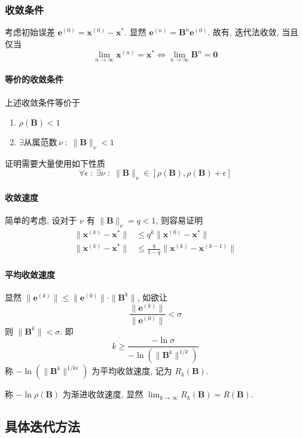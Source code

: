 \documentclass{ctexart}
\begin{document}
\subsubsection{收敛条件}
    考虑初始误差 $\mathbf{e}^{(0)} = \mathbf{x}^{(0)} - \mathbf{x}^*$.
    显然 $\mathbf{e}^{(n)} = \mathbf{B}^n \mathbf{e}^{(0)}$.
    故有, 迭代法收敛, 当且仅当 \[
        \lim_{n\to\infty} \mathbf{x}^{(n)} = \mathbf{x}^* \Leftrightarrow %
        \lim_{n\to\infty} \mathbf{B}^n = \mathbf{0}\]
\paragraph{等价的收敛条件}
    上述收敛条件等价于 \begin{enumerate}
        \item $\rho(\mathbf{B}) < 1$
        \item $\exists \text{从属范数}\,\nu\;:\;\|\mathbf{B}\|_{\nu} < 1$
    \end{enumerate}
    证明需要大量使用如下性质 \[
        \forall \epsilon\;:\;\exists\nu\;:\;\|\mathbf{B}\|_{\nu} \in [\rho(\mathbf{B}), \rho(\mathbf{B})+\epsilon]\]
\paragraph{收敛速度}
    简单的考虑, 设对于 $\nu$ 有 $\|\mathbf{B}\|_{\nu} = q < 1$, 则容易证明 \begin{align*}
        \|\mathbf{x}^{(k)} - \mathbf{x} ^*\| &\le q^k \|\mathbf{x} ^{(0)} - \mathbf{x}^*\|\\
        \|\mathbf{x} ^{(k)} - \mathbf{x} ^*\| &\le \frac{q}{1-q} \| \mathbf{x}^{(k)} - \mathbf{x}^{(k-1)}\|
    \end{align*}
\paragraph{平均收敛速度}
    显然 $\|\mathbf{e}^{(k)}\| \le \|\mathbf{e}^{(0)}\| \cdot \|\mathbf{B}^k\|$, 如欲让 \[
        \frac{\|\mathbf{e}^{(k)}\|}{\|\mathbf{e}^{(0)}\|} < \sigma\]
    则 $ \|\mathbf{B}^k\| < \sigma$. 即 \[
        k \ge \frac{-\ln\sigma}{-\ln\left(\|\mathbf{B}^k\|^{1/k}\right)}\]
    称 $-\ln\left(\|\mathbf{B}^k\|^{1/ke}\right)$ 为平均收敛速度, 记为 $R_k(\mathbf{B})$.\par
    称 $-\ln\rho(\mathbf{B})$ 为渐进收敛速度, 显然 $\lim_{k\to\infty} R_k(\mathbf{B}) = R(\mathbf{B})$.
\subsection{具体迭代方法}
\end{document}

